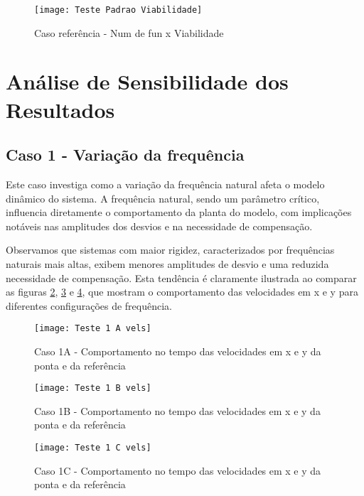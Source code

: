 \begin{figure}[H]
    \begin{center}
    \caption{Caso referência - Num de fun x Viabilidade}
    \texttt{[image: Teste Padrao Viabilidade]}
    \label{fig:t_padr_viab}
    \end{center}
\end{figure}

\section{Análise de Sensibilidade dos Resultados}
\subsection{Caso 1 - Variação da frequência}
Este caso investiga como a variação da frequência natural afeta o modelo dinâmico do sistema. A frequência natural, sendo um parâmetro crítico, influencia diretamente o comportamento da planta do modelo, com implicações notáveis nas amplitudes dos desvios e na necessidade de compensação.

Observamos que sistemas com maior rigidez, caracterizados por frequências naturais mais altas, exibem menores amplitudes de desvio e uma reduzida necessidade de compensação. Esta tendência é claramente ilustrada ao comparar as figuras \ref{fig:t_1a_vels}, \ref{fig:t_1b_vels} e \ref{fig:t_1c_vels}, que mostram o comportamento das velocidades em x e y para diferentes configurações de frequência.

\begin{figure}[H]
    \begin{center}
    \caption{Caso 1A - Comportamento no tempo das velocidades em x e y da ponta e da referência}
    \texttt{[image: Teste 1 A vels]}
    \label{fig:t_1a_vels}
    \end{center}
\end{figure}

\begin{figure}[H]
    \begin{center}
    \caption{Caso 1B - Comportamento no tempo das velocidades em x e y da ponta e da referência}
    \texttt{[image: Teste 1 B vels]}
    \label{fig:t_1b_vels}
    \end{center}
\end{figure}

\begin{figure}[H]
    \begin{center}
    \caption{Caso 1C - Comportamento no tempo das velocidades em x e y da ponta e da referência}
    \texttt{[image: Teste 1 C vels]}
    \label{fig:t_1c_vels}
    \end{center}
\end{figure}

